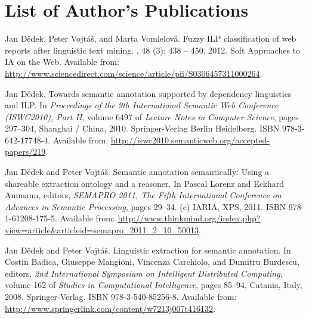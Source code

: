 \chapter{List of Author's Publications} \label{sec:my_publications}

\begin{description}


\item
Jan D{\v{e}}dek, Peter Vojt{\'{a}}{\v{s}}, and Marta Vomlelov{\'{a}}.
\newblock Fuzzy {ILP} classification of web reports after linguistic text
  mining.
, 48 (3):
  438 -- 450, 2012.
\newblock Soft Approaches to IA on the Web.
\newblock Available from:
  \url{http://www.sciencedirect.com/science/article/pii/S0306457311000264}.


\item
Jan D{\v{e}}dek.
\newblock Towards semantic annotation supported by dependency linguistics and
  {ILP}.
\newblock In {\em Proceedings of the 9th International Semantic Web Conference
  (ISWC2010), Part II}, volume 6497 of {\em Lecture Notes in Computer Science},
  pages 297--304, Shanghai / China, 2010. Springer-Verlag Berlin Heidelberg.
\newblock ISBN 978-3-642-17748-4.
\newblock Available from:
  \url{http://iswc2010.semanticweb.org/accepted-papers/219}.

\item
Jan D{\v{e}}dek and Peter Vojt{\'{a}}{\v{s}}.
\newblock Semantic annotation semantically: Using a shareable extraction
  ontology and a reasoner.
\newblock In Pascal Lorenz and Eckhard Ammann, editors, {\em {SEMAPRO 2011},
  The Fifth International Conference on Advances in Semantic Processing}, pages
  29--34. (c) {IARIA}, {XPS}, 2011.
\newblock ISBN 978-1-61208-175-5.
\newblock Available from:
  \url{http://www.thinkmind.org/index.php?view=article&articleid=semapro_2011_2_10_50013}.



\item
Jan D{\v{e}}dek and Peter Vojt{\'{a}}{\v{s}}.
\newblock Linguistic extraction for semantic annotation.
\newblock In Costin Badica, Giuseppe Mangioni, Vincenza Carchiolo, and Dumitru
  Burdescu, editors, {\em 2nd International Symposium on Intelligent
  Distributed Computing}, volume 162 of {\em Studies in Computational
  Intelligence}, pages 85--94, Catania, Italy, 2008. Springer-Verlag.
\newblock ISBN 978-3-540-85256-8.
\newblock Available from:
  \url{http://www.springerlink.com/content/w7213j007t416132}.



\end{description}
